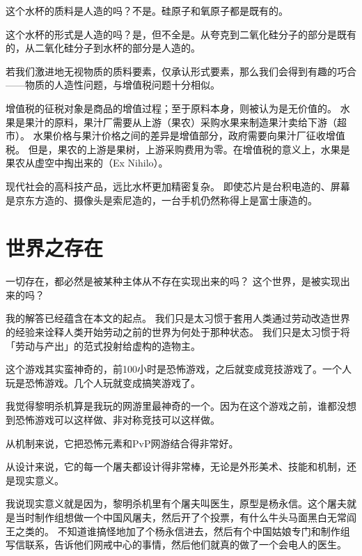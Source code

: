 这个水杯的质料是人造的吗？不是。硅原子和氧原子都是既有的。

这个水杯的形式是人造的吗？是，但不全是。从夸克到二氧化硅分子的部分是既有的，从二氧化硅分子到水杯的部分是人造的。

若我们激进地无视物质的质料要素，仅承认形式要素，那么我们会得到有趣的巧合——物质的人造性问题，与增值税问题十分相似。

增值税的征税对象是商品的增值过程；至于原料本身，则被认为是无价值的。
水果是果汁的原料，果汁厂需要从上游（果农）采购水果来制造果汁卖给下游（超市）。
水果价格与果汁价格之间的差异是增值部分，政府需要向果汁厂征收增值税。
但是，果农的上游是果树，上游采购费用为零。在增值税的意义上，水果是果农从虚空中掏出来的（Ex Nihilo）。

现代社会的高科技产品，远比水杯更加精密复杂。
即使芯片是台积电造的、屏幕是京东方造的、摄像头是索尼造的，一台手机仍然称得上是富士康造的。

\section{世界之存在}

一切存在，都必然是被某种主体从不存在实现出来的吗？
这个世界，是被实现出来的吗？

我的解答已经蕴含在本文的起点。
我们只是太习惯于套用人类通过劳动改造世界的经验来诠释人类开始劳动之前的世界为何处于那种状态。
我们只是太习惯于将「劳动与产出」的范式投射给虚构的造物主。










这个游戏其实蛮神奇的，前100小时是恐怖游戏，之后就变成竞技游戏了。一个人玩是恐怖游戏。几个人玩就变成搞笑游戏了。

我觉得黎明杀机算是我玩的网游里最神奇的一个。因为在这个游戏之前，谁都没想到恐怖游戏可以这样做、非对称竞技可以这样做。

从机制来说，它把恐怖元素和PvP网游结合得非常好。

从设计来说，它的每一个屠夫都设计得非常棒，无论是外形美术、技能和机制，还是现实意义。

我说现实意义就是因为，黎明杀机里有个屠夫叫医生，原型是杨永信。这个屠夫就是当时制作组想做一个中国风屠夫，然后开了个投票，有什么牛头马面黑白无常阎王之类的。
不知道谁搞怪地加了个杨永信进去，然后有个中国姑娘专门和制作组写信联系，告诉他们网戒中心的事情，然后他们就真的做了一个会电人的医生。

